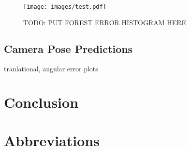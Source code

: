 \documentclass[final]{cvpr}
\begin{document}
\begin{figure}[ht!]
	\texttt{[image: images/test.pdf]}
	\caption{TODO: PUT FOREST ERROR HISTOGRAM HERE}
	\label{fig:error-hist}
\end{figure}


\subsection{Camera Pose Predictions}
tranlational, angular error
plots

\section{Conclusion}


\section*{Abbreviations}
\begin{acronym}
\end{acronym}

{\small


}
\end{document}
